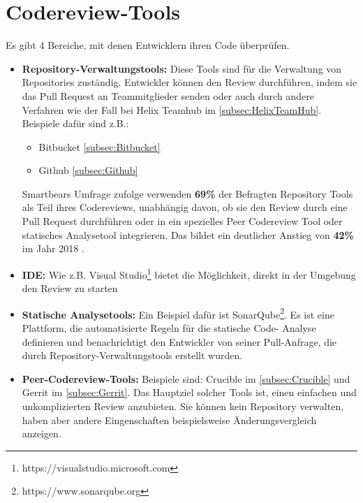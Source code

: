 \section{Codereview-Tools}
\label{sec:Coderview-Tools}

Es gibt 4 Bereiche, mit denen Entwicklern ihren Code überprüfen.

\begin{itemize}
	\item \textbf{Repository-Verwaltungstools:} Diese Tools sind für die Verwaltung von Repositories zuständig. Entwickler können den Review durchführen, indem sie das Pull Request an 				Teammitglieder senden oder auch durch andere Verfahren wie der Fall bei Helix Teamhub im \cref{subsec:HelixTeamHub}.
		Beispiele dafür sind z.B.:
		\begin{itemize}
			\item Bitbucket \cref{subsec:Bitbucket}
			\item Github \cref{subsec:Github}
		\end{itemize}
		
		Smartbears Umfrage zufolge verwenden \textbf{69\%} der Befragten Repository Tools als Teil ihres Codereviews, unabhängig davon, ob sie den Review durch eine Pull Request 					durchführen oder in ein spezielles Peer Codereview Tool oder statisches Analysetool integrieren. Das bildet ein deutlicher Anstieg von \textbf{42\%} im Jahr 2018 							\cite{smartbear}.

	\item \textbf{\ac{IDE}:} Wie z.B. Visual Studio\footnote{https://visualstudio.microsoft.com} bietet die Möglichkeit, direkt in der Umgebung den Review zu starten

	\item \textbf{Statische Analysetools:} Ein Beispiel dafür ist SonarQube\footnote{https://www.sonarqube.org}. Es ist eine Plattform, die automatisierte Regeln für die statische Code-			Analyse definieren und benachrichtigt den Entwickler von seiner Pull-Anfrage, die durch Repository-Verwaltungstools erstellt wurden.

	\item \textbf{Peer-Codereview-Tools:} Beispiele sind: Crucible im \cref{subsec:Crucible} und Gerrit im \cref{subsec:Gerrit}. Das Hauptziel solcher Tools ist, einen einfachen und 				unkomplizierten Review anzubieten. Sie können kein Repository verwalten, haben aber andere Eingenschaften beispielsweise Änderungsvergleich anzeigen.
\end{itemize}

